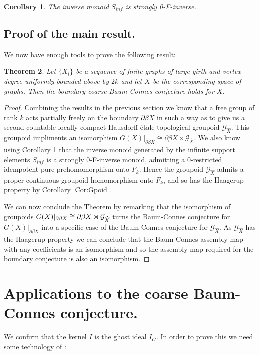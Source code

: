 \documentclass[11pt]{amsart}
\theoremstyle{plain}
\newtheorem{theorem}{Theorem}%
\newtheorem{corollary}[theorem]{Corollary}%
\theoremstyle{definition}%
\theoremstyle{remark}%
\newcommand{\G}{\mathcal{G}}
\begin{document}
\begin{corollary}\label{Cor:MT}
The inverse monoid $S_{inf}$ is strongly 0-F-inverse.
\end{corollary}

\subsection{Proof of the main result.}
We now have enough tools to prove the following result:
\begin{theorem}
Let $\lbrace X_{i} \rbrace$ be a sequence of finite graphs of large girth and vertex degree uniformly bounded above by $2k$ and let $X$ be the corresponding space of graphs. Then the boundary coarse Baum-Connes conjecture holds for $X$. 
\end{theorem}
\begin{proof}
Combining the results in the previous section we know that a free group of rank $k$ acts partially freely on the boundary $\partial\beta X$ in such a way as to give us a second countable locally compact Hausdorff \'etale topological groupoid $\G_{\widehat{X}}$. This groupoid impliments an isomorphism $G(X)|_{\partial\beta X} \cong \partial\beta X \rtimes \G_{\widehat{X}}$. We also know using Corollary \ref{Cor:MT} that the inverse monoid generated by the infinite support elements $S_{inf}$ is a strongly $0$-F-inverse monoid, admitting a $0$-restricted idempotent pure prehomomorphism onto $F_{k}$. Hence the groupoid $\G_{\widehat{X}}$ admits a proper continuous groupoid homomorphism onto $F_{k}$, and so has the Haagerup property by Corollary \ref{Cor:Gpoid}. 

We can now conclude the Theorem by remarking that the isomorphism of groupoids $G(X)|_{\partial\beta X} \\ \cong \partial\beta X \rtimes \G_{\widehat{X}}$ turns the Baum-Connes conjecture for $G(X)|_{\partial\beta X}$ into a specific case of the Baum-Connes conjecture for $\G_{\widehat{X}}$. As $\G_{\widehat{X}}$ has the Haagerup property we can conclude that the Baum-Connes assembly map with any coefficients is an isomorphism \cite{MR1798599} and so the assembly map required for the boundary conjecture is also an isomorphism.
\end{proof}

\section{Applications to the coarse Baum-Connes conjecture.}
We confirm that the kernel $I$ is the ghost ideal $I_{G}$. In order to prove this we need some technology of \cite{MR1911663}:
\end{document}
